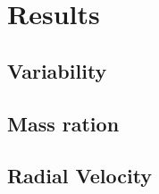 \chapter{Results}\label{chap:results}
\thispagestyle{fancy}


\def\svggwidth{\pagewidth}


\def\svggwidth{\pagewidth}



\def\svggwidth{\pagewidth}


\section{Variability}

\section{Mass ration}

\section{Radial Velocity}
